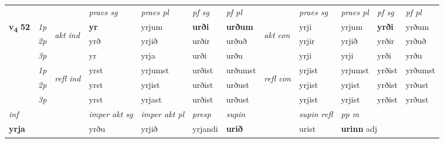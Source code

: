 \begin{longtable}[l]{X>{\footnotesize\itshape}llXXXXlXXXX}
 & &   & \textit{praes sg}  & \textit{praes pl}    & \textit{ pf sg} & \textit{pf pl} & & \textit{praes sg}  & \textit{praes pl}    & \textit{pf sg} & \textit{pf pl }  \\ \cmidrule{4-7} \cmidrule{9-12}
 \multirow{2}{*}{{{\textbf{v{\textsubscript{4}}} \Large{\textbf{52}}}}}  & 1p & \multirow{3}{*}{\begin{turn}{90}\textit{akt ind}\end{turn}} & \textbf{yr} & yrjum & \textbf{urði} & \textbf{urðum} & \multirow{3}{*}{\begin{turn}{90}\textit{akt con}\end{turn}} &yrji & yrjum & \textbf{yrði} & yrðum\\*
 & 2p &  &  yrð  & yrjið & urðir & urðuð & & yrjir & yrjið & yrðir & yrðuð \\*
 & 3p &  & yr & yrja & urði & urðu & & yrji & yrji& yrði & yrðu \\*
\cmidrule{4-7} \cmidrule{9-12}
 & 1p & \multirow{3}{*}{\begin{turn}{90}\textit{refl ind}\end{turn}}  & yrst & yrjumst & urðist & urðumst & \multirow{3}{*}{\begin{turn}{90}\textit{refl con}\end{turn}}  &yrjist & yrjumst & yrðist & yrðumst \\*
 & 2p &  & yrst & yrjist & urðist & urðust & &yrjist & yrjist & yrðist & yrðust \\*
 & 3p  & & yrst & yrjast & urðist & urðust & & yrjist & yrjist& yrðist & yrðust \\*
\cmidrule{4-7} \cmidrule{9-12}

   {\textit{inf}} & &  & \textit{imper akt sg} & \textit{imper akt pl}   & \textit{presp} & \textit{supin} && \textit{supin refl} & \textit{pp m} \\*
  {\textbf{yrja}} & && yrðu  & yrjið   & yrjandi &  \textbf{urið} && urist & \multicolumn{2}{l}{\textbf{urinn} adj\textbf{\textsubscript{}}} \\*


\end{longtable}
